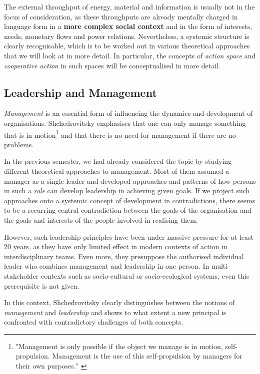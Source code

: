 \documentclass[11pt,a4paper]{article}
\begin{document}
The external throughput of energy, material and information is usually not in
the focus of consideration, as these throughputs are already mentally charged
in language form in a \textbf{more complex social context} and in the form of
interests, needs, monetary flows and power relations. Nevertheless, a systemic
structure is clearly recognisable, which is to be worked out in various
theoretical approaches that we will look at in more detail. In particular, the
concepts of \emph{action space} and \emph{cooperative action} in such spaces
will be conceptualised in more detail.

\subsection{Leadership and Management}

\emph{Management} is an essential form of influencing the dynamics and
development of organisations. Shchedrovitsky emphasises that one can only
manage something that is in motion\footnote{"Management is only possible if
  the object we manage is in motion, self-propulsion. Management is the use of
  this self-propulsion by managers for their own purposes." \cite[p. 28]{MSM}}
and that there is no need for management if there are no problems.

In the previous semester, we had already considered the topic by studying
different theoretical approaches to management.  Most of them assumed a
manager as a single leader and developed approaches and patterns of how
persons in such a \emph{role} can develop leadership in achieving given goals.
If we project such approaches onto a systemic concept of development in
contradictions, there seems to be a recurring central contradiction between
the goals of the organisation and the goals and interests of the people
involved in realising them.

However, such leadership principles have been under massive pressure for at
least 20 years, as they have only limited effect in modern contexts of action
in interdisciplinary teams. Even more, they presuppose the authorised
individual leader who combines management and leadership in one person. In
multi-stakeholder contexts such as socio-cultural or socio-ecological systems,
even this prerequisite is not given.

In this context, Shchedrovitsky clearly distinguishes between the notions of
\emph{management} and \emph{leadership} \cite[p. 27-30]{MSM} and shows to what
extent a new principal is confronted with contradictory challenges of both
concepts.
\end{document}
